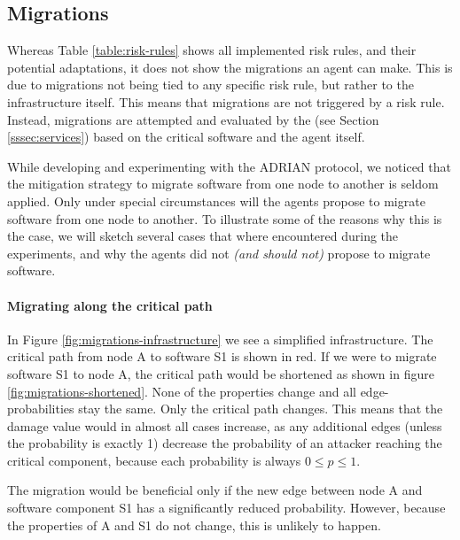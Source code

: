 \subsection{Migrations} 
\label{ssec:migrations}
Whereas Table \ref{table:risk-rules} shows all implemented risk rules, and their potential adaptations, it does not show the migrations an agent can make. This is due to migrations not being tied to any specific risk rule, but rather to the infrastructure itself. This means that migrations are not triggered by a risk rule. Instead, migrations are attempted and evaluated by the  (see Section \ref{sssec:services}) based on the critical software and the agent itself.

While developing and experimenting with the ADRIAN protocol, we noticed that the mitigation strategy to migrate software from one node to another is seldom applied. Only under special circumstances will the agents propose to migrate software from one node to another. To illustrate some of the reasons why this is the case, we will sketch several cases that where encountered during the experiments, and why the agents did not \emph{(and should not)} propose to migrate software.

\paragraph*{Migrating along the critical path}
In Figure \ref{fig:migrations-infrastructure} we see a simplified infrastructure. The critical path from node A to software S1 is shown in red. If we were to migrate software S1 to node A, the critical path would be shortened as shown in figure \ref{fig:migrations-shortened}. None of the properties change and all edge-probabilities stay the same. Only the critical path changes. This means that the damage value would in almost all cases increase, as any additional edges (unless the probability is exactly 1) decrease the probability of an attacker reaching the critical component, because each probability is always \(0 \leq p \leq 1\). 

The migration would be beneficial only if the new edge between node A and software component S1 has a significantly reduced probability. However, because the properties of A and S1 do not change, this is unlikely to happen.

